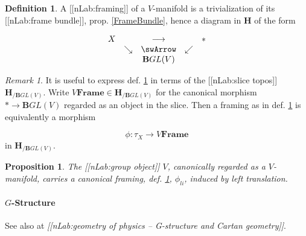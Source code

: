 \documentclass[12pt,titlepage]{article}
\newcommand{\itexarray}[1]{\begin{matrix}#1\end{matrix}}
\theoremstyle{plain}
\newtheorem{prop}{Proposition}
\theoremstyle{definition}
\newtheorem{defn}{Definition}
\theoremstyle{remark}
\newtheorem{remark}{Remark}
\begin{document}
\begin{defn}
\label{Framing}\hypertarget{Framing}{}
A [[nLab:framing]] of a $V$-manifold is a trivialization of its [[nLab:frame bundle]], prop. \ref{FrameBundle}, hence a diagram in $\mathbf{H}$ of the form

\begin{displaymath}
\itexarray{
    X && \longrightarrow && \ast
    \\
    & \searrow &\swArrow& \swarrow
    \\
    && \mathbf{B}GL(V)
  }
\end{displaymath}
\end{defn}
\begin{remark}
\label{ModuliForFramings}\hypertarget{ModuliForFramings}{}
It is useful to express def. \ref{Framing} in terms of the [[nLab:slice topos]] $\mathbf{H}_{/\mathbf{B}GL(V)}$. Write $V\mathbf{Frame}\in \mathbf{H}_{/\mathbf{B}GL(V)}$ for the canonical morphism $\ast \to \mathbf{B}GL(V)$ regarded as an object in the slice. Then a framing as in def. \ref{Framing} is equivalently a morphism

\begin{displaymath}
\phi \colon \tau_X \longrightarrow V\mathbf{Frame}
\end{displaymath}
in $\mathbf{H}_{/\mathbf{B}GL(V)}$.

\end{remark}
\begin{prop}
\label{LeftTranslationFraming}\hypertarget{LeftTranslationFraming}{}
The [[nLab:group object]] $V$, canonically regarded as a $V$-manifold, carries a canonical framing, def. \ref{Framing}, $\phi_{li}$, induced by left translation.

\end{prop}
\hypertarget{GStructure}{}\paragraph*{{$G$-Structure}}\label{GStructure}

See also at \emph{[[nLab:geometry of physics -- G-structure and Cartan geometry]]}.
\end{document}
